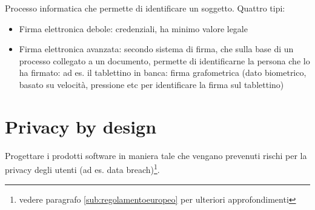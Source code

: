 Processo informatica che permette di identificare un soggetto. Quattro
tipi:

\begin{itemize}
\item
  Firma elettronica debole: credenziali, ha minimo valore legale
\item
  Firma elettronica avanzata: secondo sistema di firma, che sulla base
  di un processo collegato a un documento, permette di identificarne la
  persona che lo ha firmato: ad es. il tablettino in banca: firma
  grafometrica (dato biometrico, basato su velocit\`a, pressione etc per
  identificare la firma sul tablettino)
\end{itemize}

\section{Privacy by design}

Progettare i prodotti software in maniera tale che vengano prevenuti rischi per la privacy degli utenti (ad es. data breach)\footnote{vedere paragrafo \ref{sub:regolamentoeuropeo} per ulteriori approfondimenti}.
